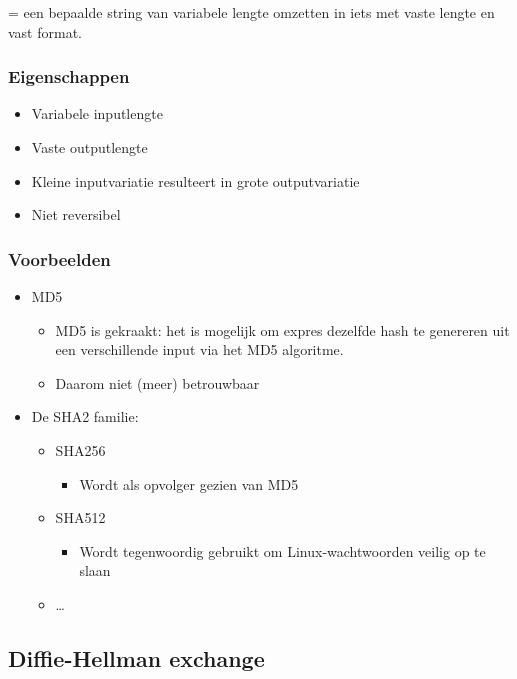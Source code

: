\documentclass{article}
\begin{document}
= een bepaalde string van variabele lengte omzetten in iets met vaste lengte en vast format. 

\subsubsection{Eigenschappen}

\begin{itemize}
    \item Variabele inputlengte
    \item Vaste outputlengte
    \item Kleine inputvariatie resulteert in grote outputvariatie
    \item Niet reversibel
\end{itemize}

\subsubsection{Voorbeelden}

\begin{itemize}
    \item MD5
    \begin{itemize}
        \item MD5 is gekraakt: het is mogelijk om expres dezelfde hash te genereren uit een verschillende input via het MD5 algoritme.
        \item Daarom niet (meer) betrouwbaar
    \end{itemize}
    \item De SHA2 familie:
    \begin{itemize}
        \item SHA256
        \begin{itemize}
            \item Wordt als opvolger gezien van MD5
        \end{itemize}
        \item SHA512
        \begin{itemize}
            \item Wordt tegenwoordig gebruikt om Linux-wachtwoorden veilig op te slaan
        \end{itemize}
        \item \dots
    \end{itemize}
    
\end{itemize}

\subsection{Diffie-Hellman exchange}
\end{document}

